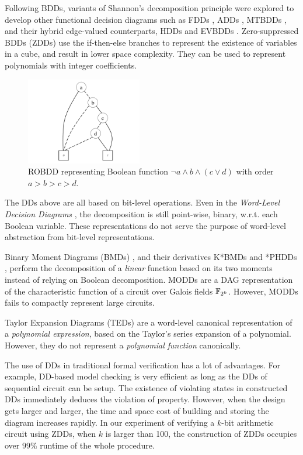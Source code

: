 Following BDDs,  variants of Shannon's decomposition principle
were explored to develop other functional decision diagrams such as
 FDDs \cite{okfdd}, ADDs \cite{add}, MTBDDs \cite{mtbdd}, and their hybrid 
edge-valued counterparts, HDDs \cite{hdd} and EVBDDs \cite{evbdd}. 
Zero-suppressed BDDs (ZDDs) \cite{minato1993zero,minato1994calculation} use the if-then-else branches
to represent the existence of variables in a cube, and result in lower 
space complexity. They can be used to represent polynomials with integer coefficients.

\begin{figure}[bp]
\centerline{
\includegraphics[width=0.45\textwidth]{newfig/BDD.pdf}
}
\caption{ROBDD representing Boolean function $\neg a \land b \land (c\lor d)$ with order $a>b>c>d$.}
\label{fig:BDD}
\end{figure}

The DDs above are all based on bit-level operations. Even in the {\it Word-Level Decision Diagrams}
\cite{WLS}, the decomposition is still point-wise, binary, 
w.r.t. each Boolean variable. These representations do not
serve the purpose of word-level abstraction from bit-level
representations. 

Binary Moment Diagrams (BMDs) \cite{bmd}, and their derivatives K*BMDs
\cite{kbmd} and *PHDDs \cite{phdd}, perform the decomposition of a {\it linear} function
based on its two moments instead of relying on Boolean decomposition. 
MODDs \cite{modd,modd_tcomp} are a DAG representation of the
characteristic function of a circuit over Galois fields ${\mathbb{F}}_{2^k}$. 
However, MODDs fails to compactly represent large circuits.


Taylor Expansion Diagrams (TEDs) \cite{ted_tcomp} are a
word-level canonical representation of a {\it polynomial expression},
based on the Taylor's series expansion of a polynomial. However, they do
not represent a {\it polynomial function} canonically. 

The use of DDs in traditional formal verification has a lot of advantages. 
For example, DD-based model checking is very efficient as long as the DDs of sequential 
circuit can be setup. The existence of violating states in constructed DDs 
immediately deduces the violation of property. However, when the design gets
larger and larger, the time and space cost of building and storing the diagram 
increases rapidly. In our experiment of verifying a $k$-bit arithmetic circuit 
using ZDDs, when $k$ is larger than 100, the construction of ZDDs occupies 
over $99\%$ runtime of the whole procedure.
